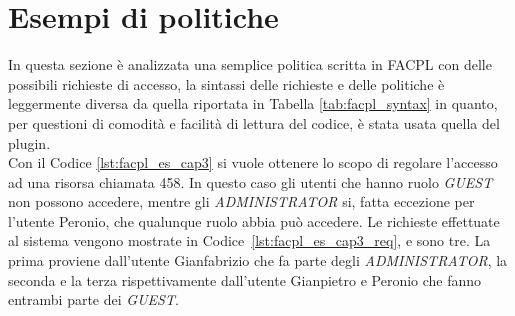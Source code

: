 \section{Esempi di politiche} %
\label{sec:esempio_di_politica_con_facpl}
In questa sezione è analizzata una semplice politica scritta in FACPL con delle possibili richieste di accesso, la sintassi delle richieste e delle politiche è leggermente diversa da quella riportata in Tabella \ref{tab:facpl_syntax} in quanto, per questioni di comodità e facilità di lettura del codice, è stata usata quella del plugin.\\
 
Con il Codice \ref{lst:facpl_es_cap3} si vuole ottenere lo scopo di regolare l'accesso ad una risorsa chiamata 458. In questo caso gli utenti che hanno ruolo \textit{GUEST} non possono accedere, mentre gli \textit{ADMINISTRATOR} si, fatta eccezione per l'utente Peronio, che qualunque ruolo abbia può accedere.
Le richieste effettuate al sistema vengono mostrate in Codice~\ref{lst:facpl_es_cap3_req}, e sono tre. La prima proviene dall'utente Gianfabrizio che fa parte degli \textit{ADMINISTRATOR}, la seconda e la terza rispettivamente dall'utente Gianpietro e Peronio che fanno entrambi parte dei \textit{GUEST}. 
 

